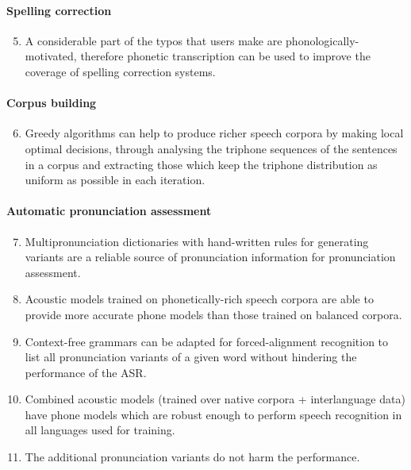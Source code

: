 \paragraph*{Spelling correction}
  \begin{enumerate}
    \setcounter{enumi}{4}
    \item A considerable part of the typos that users make are phonologically-motivated, therefore phonetic transcription can be used to improve the coverage of spelling correction systems.
  \end{enumerate}

\paragraph*{Corpus building}
  \begin{enumerate}
    \setcounter{enumi}{5}
    \item Greedy algorithms can help to produce richer speech corpora by making local optimal decisions, through analysing the triphone sequences of the sentences in a corpus and extracting those which keep the triphone distribution as uniform as possible in each iteration.
  \end{enumerate}

\paragraph*{Automatic pronunciation assessment}
  \begin{enumerate}
    \setcounter{enumi}{6}
    \item Multipronunciation dictionaries with hand-written rules for generating variants are a reliable source of pronunciation information for pronunciation assessment.
    \item Acoustic models trained on phonetically-rich speech corpora are able to provide more accurate phone models than those trained on balanced corpora.
    \item Context-free grammars can be adapted for forced-alignment recognition to list all pronunciation variants of a given word without hindering the performance of the \ac{ASR}.
    \item Combined acoustic models (trained over native corpora + interlanguage data) have phone models which are robust enough to perform speech recognition in all languages used for training.
    \item The additional pronunciation variants do not harm the performance.
  \end{enumerate}

